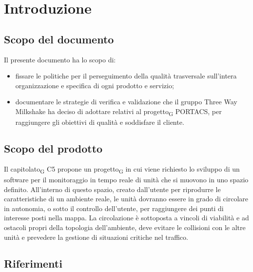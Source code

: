 \section{Introduzione}
\subsection{Scopo del documento}
    Il presente documento ha lo scopo di:
    \begin{itemize}
        \item fissare le politiche per il perseguimento della qualità trasversale sull'intera organizzazione e specifica di ogni prodotto e servizio;
        \item documentare le strategie di verifica e validazione che il gruppo Three Way Milkshake ha deciso di adottare relativi al \gls{progetto}\textsubscript{G} PORTACS, per raggiungere gli obiettivi di qualità e soddisfare il cliente.
    \end{itemize}


\subsection{Scopo del prodotto}
    
    Il \gls{capitolato}\textsubscript{G} C5 propone un \gls{progetto}\textsubscript{G} in cui viene richiesto lo sviluppo di un software per il monitoraggio in tempo reale di unità che si muovono in uno spazio definito. All'interno di questo spazio, creato dall'utente per riprodurre le caratteristiche di un ambiente reale, le unità dovranno essere in grado di circolare in autonomia, o sotto il controllo dell'utente, per raggiungere dei punti di interesse posti nella mappa.  La circolazione è sottoposta a vincoli di viabilità e ad ostacoli propri della topologia dell'ambiente, deve evitare le collisioni con le altre unità e prevedere la gestione di situazioni critiche nel traffico.

\subsection{Riferimenti}
\label{ref}
